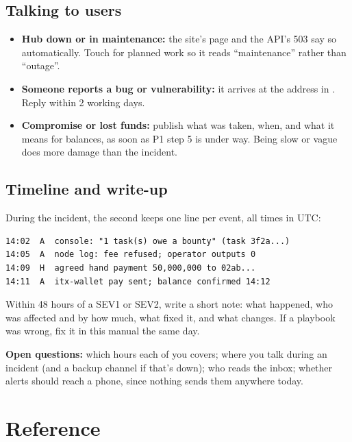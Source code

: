 \documentclass[11pt]{article}
\begin{document}
\subsection{Talking to users}

\begin{itemize}[leftmargin=1.5em]
  \item \textbf{Hub down or in maintenance:} the site's  page and the API's 503 say so automatically. Touch  for planned work so it reads ``maintenance'' rather than ``outage''.
  \item \textbf{Someone reports a bug or vulnerability:} it arrives at the  address in . Reply within 2 working days.
  \item \textbf{Compromise or lost funds:} publish what was taken, when, and what it means for balances, as soon as P1 step 5 is under way. Being slow or vague does more damage than the incident.
\end{itemize}

\subsection{Timeline and write-up}

During the incident, the second keeps one line per event, all times in UTC:

\begin{lstlisting}
14:02  A  console: "1 task(s) owe a bounty" (task 3f2a...)
14:05  A  node log: fee refused; operator outputs 0
14:09  H  agreed hand payment 50,000,000 to 02ab...
14:11  A  itx-wallet pay sent; balance confirmed 14:12
\end{lstlisting}

Within 48 hours of a SEV1 or SEV2, write a short note: what happened, who was affected and by how much, what fixed it, and what changes. If a playbook was wrong, fix it in this manual the same day.

\textbf{Open questions:} which hours each of you covers; where you talk during an incident (and a backup channel if that's down); who reads the  inbox; whether alerts should reach a phone, since nothing sends them anywhere today.

\section{Reference}
\label{sec:reference}
\end{document}
